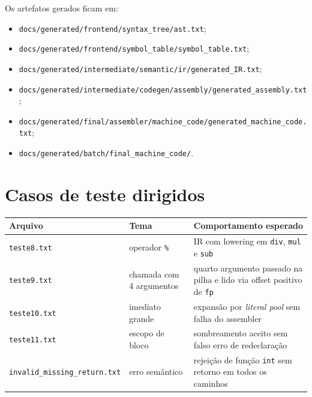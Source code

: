 \documentclass[12pt,a4paper]{article}
\begin{document}
Os artefatos gerados ficam em:
\begin{itemize}[leftmargin=1.5em]
    \item \texttt{docs/generated/frontend/syntax\_tree/ast.txt};
    \item \texttt{docs/generated/frontend/symbol\_table/symbol\_table.txt};
    \item \texttt{docs/generated/intermediate/semantic/ir/generated\_IR.txt};
    \item \texttt{docs/generated/intermediate/codegen/assembly/generated\_assembly.txt};
    \item \texttt{docs/generated/final/assembler/machine\_code/generated\_machine\_code.txt};
    \item \texttt{docs/generated/batch/final\_machine\_code/}.
\end{itemize}

\section{Casos de teste dirigidos}
\begin{longtable}{>{\raggedright\arraybackslash}p{} >{\raggedright\arraybackslash}p{} >{\raggedright\arraybackslash}p{}}
\toprule
\textbf{Arquivo} & \textbf{Tema} & \textbf{Comportamento esperado} \\
\midrule
\endhead
\texttt{teste8.txt} & operador \texttt{\%} & IR com lowering em \texttt{div}, \texttt{mul} e \texttt{sub} \\
\texttt{teste9.txt} & chamada com 4 argumentos & quarto argumento passado na pilha e lido via offset positivo de \texttt{fp} \\
\texttt{teste10.txt} & imediato grande & expansão por \emph{literal pool} sem falha do assembler \\
\texttt{teste11.txt} & escopo de bloco & sombreamento aceito sem falso erro de redeclaração \\
\texttt{invalid\_missing\_return.txt} & erro semântico & rejeição de função \texttt{int} sem retorno em todos os caminhos \\
\bottomrule
\end{longtable}
\end{document}
